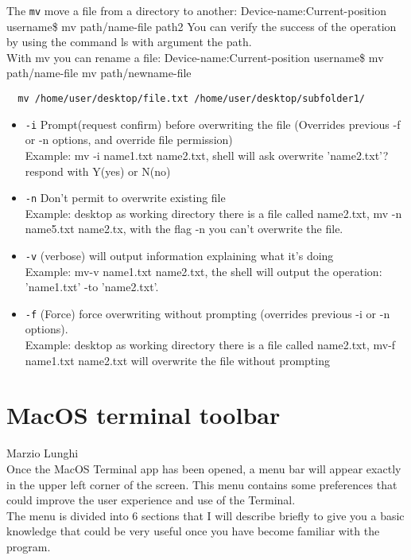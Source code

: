 \documentclass[hidelinks,12pt,a4paper,numbers=enddot]{scrartcl}
\begin{document}
The \texttt{mv}  move a file from a directory to another:
  Device-name:Current-position username\$ mv path/name-file path2
You can verify the success of the operation by using the command ls with argument the path. \\
With mv you can rename a file: Device-name:Current-position username\$ mv path/name-file mv path/newname-file


\begin{verbatim}
  mv /home/user/desktop/file.txt /home/user/desktop/subfolder1/
\end{verbatim}

\begin{itemize}
  \item \texttt{-i} Prompt(request confirm) before overwriting the file (Overrides previous -f or -n options, and override file permission) \\
  Example: mv -i name1.txt name2.txt, shell will ask overwrite 'name2.txt'? respond with Y(yes) or N(no)
  \item \texttt{-n} Don't permit to overwrite existing file \\
  Example: desktop as working directory there is a file called name2.txt, mv -n name5.txt name2.tx, with the flag -n you can't overwrite the file. 
  \item \texttt{-v} (verbose) will output information explaining what it's doing \\
  Example: mv-v name1.txt name2.txt, the shell will output the operation: 'name1.txt' -to 'name2.txt'. 
  \item \texttt{-f} (Force) force overwriting without prompting (overrides previous -i or -n options).\\
  Example: desktop as working directory there is a file called name2.txt, mv-f name1.txt name2.txt will overwrite the file without prompting
\end{itemize}

\section{MacOS terminal toolbar}


\large Marzio Lunghi \normalsize\\



Once the MacOS Terminal app has been opened, a menu bar will appear exactly in the upper
left corner of the screen. This menu contains some preferences that could improve the user
experience and use of the Terminal.\\
The menu is divided into 6 sections that I will describe briefly to give you a basic knowledge
that could be very useful once you have become familiar with the program.
\end{document}
